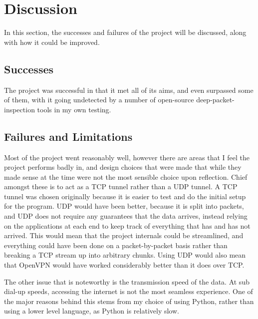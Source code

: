 \section{Discussion}
In this section, the successes and failures of the project will be discussed, along with how it could be improved.
\subsection{Successes}
The project was successful in that it met all of its aims, and even surpassed some of them, with it going undetected by a number of open-source deep-packet-inspection tools in my own testing.

\subsection{Failures and Limitations}
Most of the project went reasonably well, however there are areas that I feel the project performs badly in, and design choices that were made that while they made sense at the time were not the most sensible choice upon reflection.
Chief amongst these is to act as a TCP tunnel rather than a UDP tunnel. A TCP tunnel was chosen originally because it is easier to test and do the initial setup for the program.
UDP would have been better, because it is split into packets, and UDP does not require any guarantees that the data arrives, instead relying on the applications at each end to keep track of everything that has and has not arrived.
This would mean that the project internals could be streamlined, and everything could have been done on a packet-by-packet basis rather than breaking a TCP stream up into arbitrary chunks.
Using UDP would also mean that OpenVPN would have worked considerably better than it does over TCP\@.\par
The other issue that is noteworthy is the transmission speed of the data.
At sub dial-up speeds, accessing the internet is not the most seamless experience.
One of the major reasons behind this stems from my choice of using Python, rather than using a lower level language, as Python is relatively slow.
